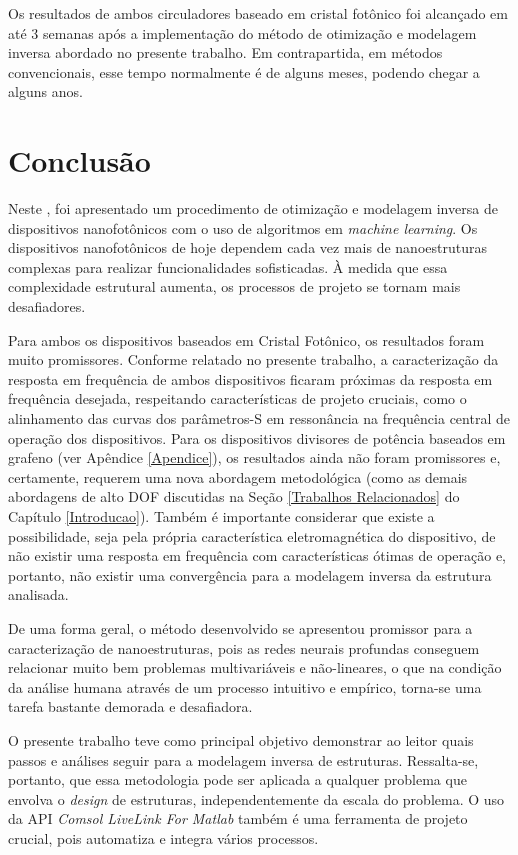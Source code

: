 Os resultados de ambos circuladores baseado em cristal fotônico foi alcançado em até 3 semanas após a implementação do método de otimização e modelagem inversa abordado no presente trabalho. Em contrapartida, em métodos convencionais, esse tempo normalmente é de alguns meses, podendo chegar a alguns anos.

\newpage
\section{Conclusão}

Neste \imprimirtipotrabalho, foi apresentado um procedimento de otimização e modelagem inversa de dispositivos nanofotônicos com o uso de algoritmos em \textit{machine learning}. Os dispositivos nanofotônicos de hoje dependem cada vez mais de nanoestruturas complexas para realizar funcionalidades sofisticadas. À medida que essa complexidade estrutural aumenta, os processos de projeto se tornam mais desafiadores.

Para ambos os dispositivos baseados em Cristal Fotônico, os resultados foram muito promissores. Conforme relatado no presente trabalho, a caracterização da resposta em frequência de ambos dispositivos ficaram próximas da resposta em frequência desejada, respeitando características de projeto cruciais, como o alinhamento das curvas dos parâmetros-S em ressonância na frequência central de operação dos dispositivos. Para os dispositivos divisores de potência baseados em grafeno (ver Apêndice \ref{Apendice}), os resultados ainda não foram promissores e, certamente, requerem uma nova abordagem metodológica (como as demais abordagens de alto DOF discutidas na Seção \ref{Trabalhos Relacionados} do Capítulo \ref{Introducao}). Também é importante considerar que existe a possibilidade, seja pela própria característica eletromagnética do dispositivo, de não existir uma resposta em frequência com características ótimas de operação e, portanto, não existir uma convergência para a modelagem inversa da estrutura analisada.

De uma forma geral, o método desenvolvido se apresentou promissor para a caracterização de nanoestruturas, pois as redes neurais profundas conseguem relacionar muito bem problemas multivariáveis e não-lineares, o que na condição da análise humana através de um processo intuitivo e empírico, torna-se uma tarefa bastante demorada e desafiadora.

O presente trabalho teve como principal objetivo demonstrar ao leitor quais passos e análises seguir para a modelagem inversa de estruturas. Ressalta-se, portanto, que essa metodologia pode ser aplicada a qualquer problema que envolva o \textit{design} de estruturas, independentemente da escala do problema. O uso da API \textit{Comsol LiveLink For Matlab} também é uma ferramenta de projeto crucial, pois automatiza e integra vários processos.


